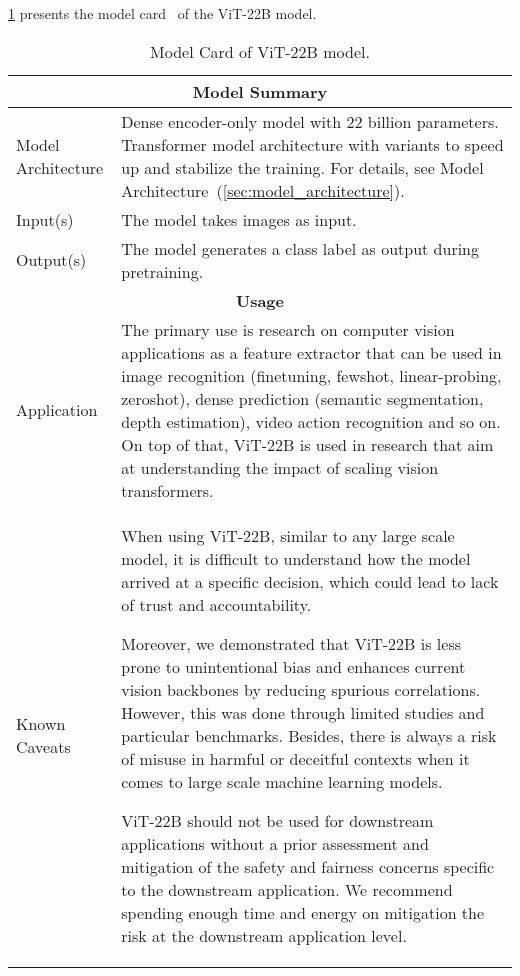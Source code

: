 \documentclass{article}
\newcommand{\chonk}{\mbox{ViT-22B}\xspace}
\begin{document}
\cref{tab:model_card} presents the model card~\citep{mitchell2019model} of the \chonk model.

{\fontsize{9pt}{9pt}\selectfont
\begin{longtable}[c]{ p{} | p{} }
\caption{Model Card of \chonk model.}
\label{tab:model_card}
\endfirsthead
\endhead
\toprule
\multicolumn{2}{c}{\textbf{Model Summary}}      \\ \toprule
\multicolumn{1}{l|}{Model Architecture} & 
Dense encoder-only model with 22 billion parameters. Transformer model architecture with variants to speed up and stabilize the training. For details, see Model Architecture~(\cref{sec:model_architecture}).  \\ \midrule
\multicolumn{1}{l|}{Input(s)} & 
The model takes images as input. \\ \midrule
\multicolumn{1}{l|}{Output(s)} & 
The model generates a class label as output during pretraining. \\
\toprule
\multicolumn{2}{c}{\textbf{Usage}}      \\ \toprule
\multicolumn{1}{l|}{Application} & 
The primary use is research on computer vision applications as a feature extractor that can be used in image recognition (finetuning, fewshot, linear-probing, zeroshot), dense prediction (semantic segmentation, depth estimation), video action recognition and so on. On top of that, \chonk is used in research that aim at understanding the impact of scaling vision transformers. \\ 
\midrule
\multicolumn{1}{l|}{Known Caveats} & 
When using \chonk, similar to any large scale model, it is difficult to understand how the model arrived at a specific decision, which could lead to lack of trust and accountability.

Moreover, we demonstrated that \chonk is less prone to unintentional bias and enhances current vision backbones by reducing spurious correlations. However, this was done through limited studies and particular benchmarks. Besides, there is always a risk of misuse in harmful or deceitful contexts when it comes to large scale machine learning models. 

\chonk should not be used for downstream applications without a prior assessment and mitigation of the safety and fairness concerns specific to the downstream application. We recommend spending enough time and energy on mitigation the risk at the downstream application level.  
\\
\toprule


\end{longtable}}
\end{document}

